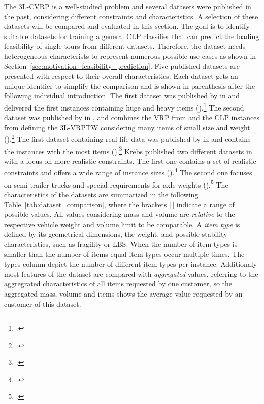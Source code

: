 The \gls{3L-CVRP} is a well-studied problem and several datasets were published in the past, considering
different constraints and characteristics. A selection of these datasets will be compared and evaluated
in this section. The goal is to identify suitable datasets for training a general \gls{CLP} classifier that can predict
the loading feasibility of single tours from different datasets. Therefore, the dataset needs
heterogeneous characterists to represent numerous possible use-cases
as shown in Section~\ref{sec:motivation_feasibility_prediction}. Five published
 datasets are presented with respect to their overall characteristics.
Each dataset gets an unique identfier to simplify the comparison and is shown in parenthesis
after the following individual introduction. The first  dataset was published by \citeauthor{gendreau_tabu_2006} in
\citeyear{gendreau_tabu_2006} and delivered the first  instances containing huge and heavy items (\gendreauDataSet).\footcite[cf.][]{gendreau_tabu_2006}
The second dataset was published by \citeauthor{moura_integrated_2009} in \citeyear{moura_integrated_2009},
and combines the \gls{VRP} from \citeauthor{solomon_algorithms_1987} and the \gls{CLP} instances from
\citeauthor{bischoff_issues_1995} defining the \gls{3L-VRPTW} considering
many items of small size and weight (\mouraDataSet).\footcites[cf.][]{solomon_algorithms_1987}[][]{bischoff_issues_1995}[][]{moura_integrated_2009}
The first dataset containing real-life data was published by \citeauthor{ceschia_local_2013} in \citeyear{ceschia_local_2013}
and contains the instances with the most items (\ceschiaDataSet).\footcite[cf.][]{ceschia_local_2013}
Krebs published two different datasets in
\citeyear{krebs_advanced_2021} with a focus on more realistic constraints. The first one contains a set
of realistic constraints and offers a wide range of instance sizes (\krebsADataSet).\footcite[cf.][]{krebs_advanced_2021}
The second one focuses on semi-trailer trucks and special requirements for axle weights (\krebsBDataSet).\footcite[cf.][]{krebs_axle_2021}
The characteristics of the datasets are summarized in the following Table~\ref{tab:dataset_comparison},
where the brackets [\,] indicate a range of possible values. All values considering mass and volume are
\textit{relative} to the respective vehicle weight and volume limit to be comparable. A \textit{item type} is
defined by its geometrical dimensions, the weight, and possible stability characteristics, such as fragility or \gls{LBS}.
When the number of item types is smaller than the number of items equal item types occur multiple times. The types column
depict the number of different item types per instance. Additionaly
most features of the dataset are compared with \textit{aggregated}  values, referring to the aggregrated characteristics
of all items requested by one customer, so the aggregated mass, volume and items shows the average value requested by an
customer of this dataset.

